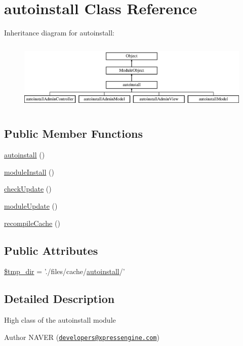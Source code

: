 \hypertarget{classautoinstall}{\section{autoinstall Class Reference}
\label{classautoinstall}
}
Inheritance diagram for autoinstall\+:\begin{figure}[H]
\begin{center}
\leavevmode
\includegraphics[height=3.353293cm]{classautoinstall}
\end{center}
\end{figure}
\subsection*{Public Member Functions}
\begin{DoxyCompactItemize}
\item 
\hyperlink{classautoinstall_aa76d5fcbf6ac9450b810acefa4b85a51}{autoinstall} ()
\item 
\hyperlink{classautoinstall_ad783aa6031577dca5fdcc7f6ea61f452}{module\+Install} ()
\item 
\hyperlink{classautoinstall_a74f260b0d1254c8e4dbd69b532072a95}{check\+Update} ()
\item 
\hyperlink{classautoinstall_a856f1e61cac8e20ed0df58a6a10f61a8}{module\+Update} ()
\item 
\hyperlink{classautoinstall_a7455962a1f07ea4c4e28971fa8dde715}{recompile\+Cache} ()
\end{DoxyCompactItemize}
\subsection*{Public Attributes}
\begin{DoxyCompactItemize}
\item 
\hyperlink{classautoinstall_a157882a0b8cc81818aa516880f2ba5dc}{\$tmp\+\_\+dir} = './files/cache/\hyperlink{classautoinstall}{autoinstall}/'
\end{DoxyCompactItemize}


\subsection{Detailed Description}
High class of the autoinstall module \begin{DoxyAuthor}{Author}
N\+A\+V\+E\+R (\href{mailto:developers@xpressengine.com}{\tt developers@xpressengine.\+com}) 
\end{DoxyAuthor}


